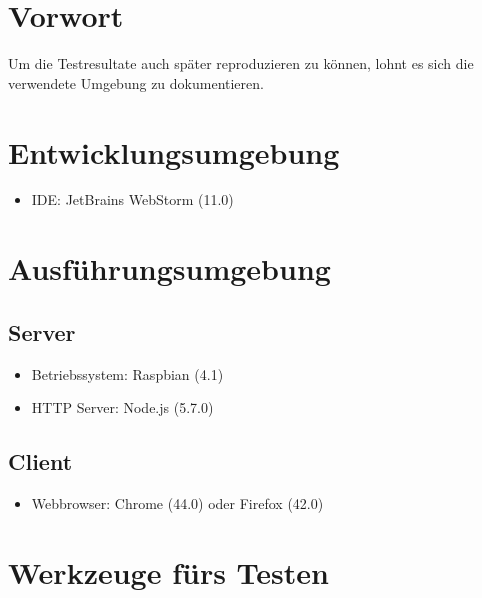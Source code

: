 \documentclass[qualitaetssicherung.tex]{subfiles}
\begin{document}
\section*{Vorwort}
Um die Testresultate auch später reproduzieren zu können, lohnt es sich die verwendete Umgebung zu dokumentieren.
\section{Entwicklungsumgebung}
	\begin{itemize}
		\item IDE: JetBrains WebStorm (11.0)
	\end{itemize}
\section{Ausführungsumgebung}
	\subsection{Server}
		\begin{itemize}
			\item Betriebssystem: Raspbian (4.1)
			\item HTTP Server: Node.js (5.7.0)
		\end{itemize}
	\subsection{Client}
		\begin{itemize}
			\item Webbrowser: Chrome (44.0) oder Firefox (42.0)
		\end{itemize}
\section{Werkzeuge fürs Testen}\label{werkzeuge}
\end{document}
